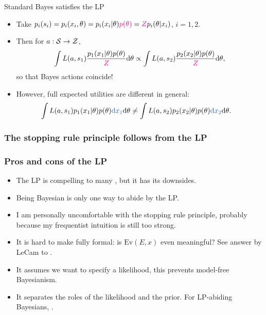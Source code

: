 \documentclass[10pt]{beamer}
\begin{document}
\begin{frame}{Standard Bayes satisfies the LP}
\begin{itemize}
  \item Take $p_i(s_i) = p_i(x_i,\theta) = p_i(x_i\vert\theta)\textcolor{magenta}{p(\theta)} = \textcolor{magenta}{Z} p_i(\theta\vert x_i)$, $i=1,2$.
  \vfill
  \item Then for $a:\mathcal{S}\rightarrow\mathcal{Z}$,
  $$ \int L(a,s_1) \frac{p_1(x_1\vert\theta)p(\theta)}{\textcolor{magenta}{Z}} {\rm d}\theta \propto \int L(a,s_2) \frac{p_2(x_2\vert\theta)p(\theta)}{\textcolor{magenta}{Z}} {\rm d}\theta, $$
  so that Bayes actions coincide!
  \vfill
  \item However, full expected utilities are different in general:
  \begin{align*}
    \int L(a,s_1) p_1(x_1\vert\theta)p(\theta) \unn{\d x_1}\d\theta
    &\neq \int L(a,s_2) p_2(x_2\vert\theta)p(\theta) \unn{\d x_2}\d\theta.
  \end{align*}
\end{itemize}
\end{frame}

\begin{frame}
  \frametitle{The stopping rule principle follows from the LP}
\end{frame}

\begin{frame}
\frametitle{Pros and cons of the LP}
\begin{itemize}
  \item The LP is compelling to many \citep{BeWo88}, but it has its downsides.
  \item Being Bayesian is only one way to abide by the LP.
  \item I am personally uncomfortable with the stopping rule principle, probably because my frequentist intuition is still too strong.
  \item It is hard to make fully formal: is $\text{Ev}(E,x)$ even meaningful? See answer by LeCam to \citep{BeWo88}.
  \item It assumes we want to specify a likelihood, this prevents model-free Bayesianism.
  \item It separates the roles of the likelihood and the prior. For LP-abiding Bayesians, .
\end{itemize}
\end{frame}

\end{document}
